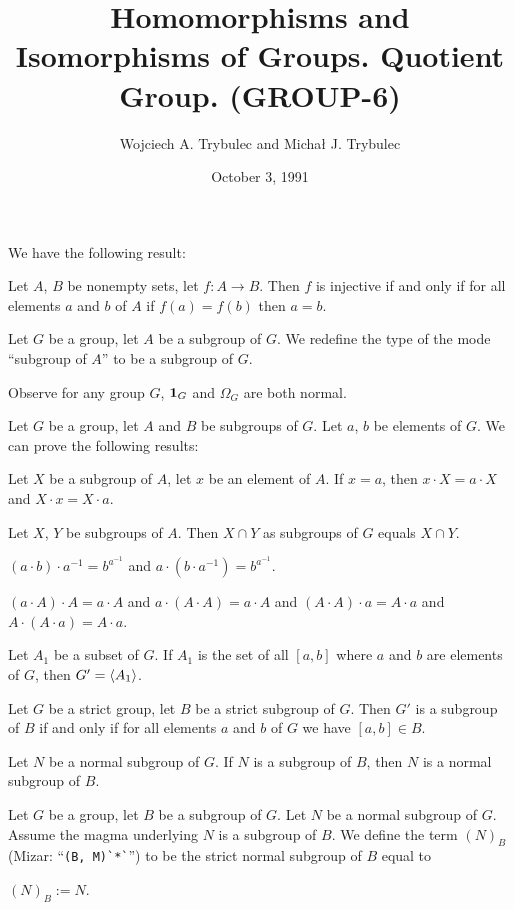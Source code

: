 \documentclass{article}
\title{Homomorphisms and Isomorphisms of Groups. Quotient Group. (GROUP-6)}
\author{Wojciech A. Trybulec and Micha{\l} J. Trybulec}
\date{October 3, 1991}
\begin{document}
\maketitle

We have the following result:
\begin{thm}
\item\label{group6:1} Let $A$, $B$ be nonempty sets, let $f\colon A\to B$.
  Then $f$ is injective if and only if for all elements $a$ and $b$ of $A$
  if $f(a)=f(b)$ then $a=b$.
\end{thm}

\begin{definition}
Let $G$ be a group, let $A$ be a subgroup of $G$.
We redefine the type of the mode ``subgroup of $A$'' to be a subgroup of $G$.
\end{definition}

Observe for any group $G$, $\mathbf{1}_{G}$ and $\Omega_{G}$ are
both normal.

Let $G$ be a group, let $A$ and $B$ be subgroups of $G$.
Let $a$, $b$ be elements of $G$.
We can prove the following results:
\begin{thm}
\item\label{group6:2} Let $X$ be a subgroup of $A$, let $x$ be an
  element of $A$. If $x=a$, then $x\cdot X=a\cdot X$ and $X\cdot x=X\cdot a$.
\item\label{group6:3} Let $X$, $Y$ be subgroups of $A$.
  Then $X\cap Y$ as subgroups of $G$ equals $X\cap Y$.
\item\label{group6:4} $(a\cdot b)\cdot a^{-1}=b^{a^{-1}}$ and
  $a\cdot(b\cdot a^{-1})=b^{a^{-1}}$.
\item\label{group6:5} $(a\cdot A)\cdot A=a\cdot A$ and $a\cdot(A\cdot A)=a\cdot A$
  and $(A\cdot A)\cdot a=A\cdot a$ and $A\cdot(A\cdot a)=A\cdot a$.
\item\label{group6:6} Let $A_{1}$ be a subset of $G$.
  If $A_{1}$ is the set of all $[a,b]$ where $a$ and $b$ are elements of $G$,
  then $G'=\langle A_{1}\rangle$.
\item\label{group6:7}  Let $G$ be a strict group, let $B$ be a strict
  subgroup of $G$. Then $G'$ is a subgroup of $B$ if and only if for all
  elements $a$ and $b$ of $G$ we have $[a,b]\in B$.
\item\label{group6:8} Let $N$ be a normal subgroup of $G$.
  If $N$ is a subgroup of $B$, then $N$ is a normal subgroup of $B$.
\end{thm}

\begin{definition}
Let $G$ be a group, let $B$ be a subgroup of $G$. Let $N$ be a normal
subgroup of $G$. Assume the magma underlying $N$ is a subgroup of $B$.
We define the term $(N)_{B}$ (Mizar: ``\verb#(B, M)`*`#'') to be the
strict normal subgroup of $B$ equal to
\begin{defn}
\item $(N)_{B}:=N$.
\end{defn}
\end{definition}
\end{document}
